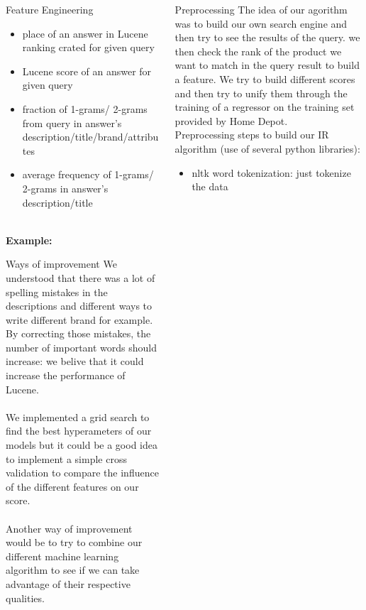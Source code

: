 \documentclass{beamer}
\newlength\postercolumnwidth
\newlength\totalwidth
\begin{document}
\begin{frame}[t]{}
\begin{columns}[totalwidth=\totalwidth]
\begin{column}[t]{\postercolumnwidth}
\begin{block}{Feature Engineering}
\begin{itemize}

\item place of an answer in Lucene ranking crated for given query
\item Lucene score of an answer for given query
\item fraction of 1-grams/ 2-grams from query in answer's description/title/brand/attributes
\item average frequency of 1-grams/ 2-grams in answer's description/title 

\end{itemize}

\\
\textbf{Example:}
\\

    \end{block}
  \begin{block}{Ways of improvement}
\small
We understood that there was a lot of spelling mistakes in the descriptions and different ways to write different brand for example. By correcting those mistakes, the number of important words should increase: we belive that it could increase the performance of Lucene.
\\
\\
We implemented a grid search to find the best hyperameters of our models but it could be a good idea to implement a simple cross validation to compare the influence of the different features on our score.
\\
\\
Another way of improvement would be to try to combine our different machine learning algorithm to see if we can take advantage of their respective qualities.
    \end{block}
  \end{column}
  \begin{column}[t]{\postercolumnwidth}
    \centering
     \begin{block}{Preprocessing}
 \small
The idea of our agorithm was to build our own search engine and then try to see the results of the query. we then check the rank of the product we want to match in the query result to build a feature. We try to build different scores and then try to unify them through the training of a regressor on the training set provided by Home Depot. 
\\Preprocessing steps to build our IR algorithm (use of several python libraries): 
\begin{itemize}
\item nltk word tokenization: just tokenize the data

\end{itemize}
\end{block}
\end{column}
\end{columns}
\end{frame}
\end{document}
